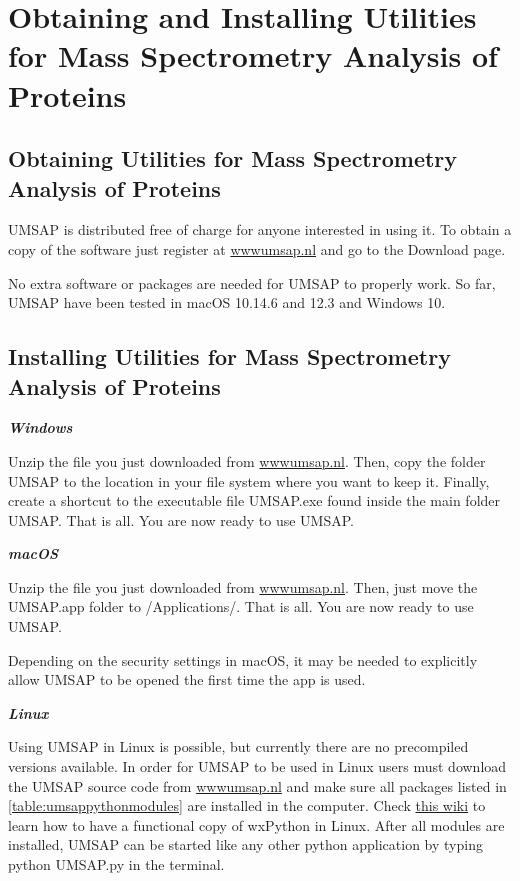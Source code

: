 \chapter{Obtaining and Installing Utilities for Mass Spectrometry Analysis of Proteins}

\section{Obtaining Utilities for Mass Spectrometry Analysis of Proteins}

UMSAP is distributed free of charge for anyone interested in using it. To obtain
a copy of the software just register at \href{https://www.umsap.nl}{wwwumsap.nl}
and go to the Download page.

No extra software or packages are needed for UMSAP to properly work. So far, 
UMSAP have been tested in macOS \num[parse-numbers=false]{10.14.6} and
\num[parse-numbers=false]{12.3} and Windows \num{10}.

\section{Installing Utilities for Mass Spectrometry Analysis of Proteins}

\textit{\textbf{Windows}}

Unzip the file you just downloaded from \href{https://www.umsap.nl}{wwwumsap.nl}.
Then, copy the folder UMSAP to the location in your file system where you want
to keep it. Finally, create a shortcut to the executable file UMSAP.exe found
inside the main folder UMSAP. That is all. You are now ready to use UMSAP.

\textit{\textbf{macOS}}

Unzip the file you just downloaded from \href{https://www.umsap.nl}{wwwumsap.nl}.
Then, just move the UMSAP.app folder to /Applications/. That is all. You are now
ready to use UMSAP. 

Depending on the security settings in macOS, it may be needed to explicitly allow
UMSAP to be opened the first time the app is used.

\textit{\textbf{Linux}}

Using UMSAP in Linux is possible, but currently there are no precompiled versions
available. In order for UMSAP to be used in Linux users must download the UMSAP source
code from \href{https://www.umsap.nl}{wwwumsap.nl} and make sure all packages listed
in \autoref{table:umsappythonmodules} are installed in the computer. Check 
\href{https://wiki.wxpython.org/How%20to%20install%20wxPython}{this wiki} to learn
how to have a functional copy of wxPython in Linux. After all modules are installed,
UMSAP can be started like any other python application by typing python UMSAP.py in
the terminal.

